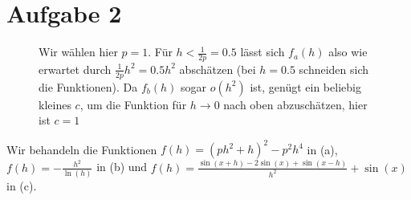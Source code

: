 \documentclass{article}
\theoremstyle{definition}
\begin{document}
\section*{Aufgabe 2}
\begin{figure}
	\caption{Wir wählen hier $p = 1$. Für $h < \frac{1}{2p} = 0.5$ lässt sich $f_a(h)$ also wie erwartet durch $\frac{1}{2p}h^2= 0.5h^2$ abschätzen (bei $h=0.5$ schneiden sich die Funktionen). Da $f_b(h)$ sogar $o(h^2)$ ist, genügt ein beliebig kleines $c$, um die Funktion für $h\to 0$ nach oben abzuschätzen, hier ist $c = 1$}
\end{figure}
Wir behandeln die Funktionen $f(h) = (ph^2 + h)^2 - p^2h^4$ in (a), $f(h) = -\frac{h^2}{\ln(h)}$ in (b) und $f(h) = \frac{\sin(x+h) - 2\sin(x) + \sin(x-h)}{h^2} + \sin(x)$ in (c).
\end{document}
